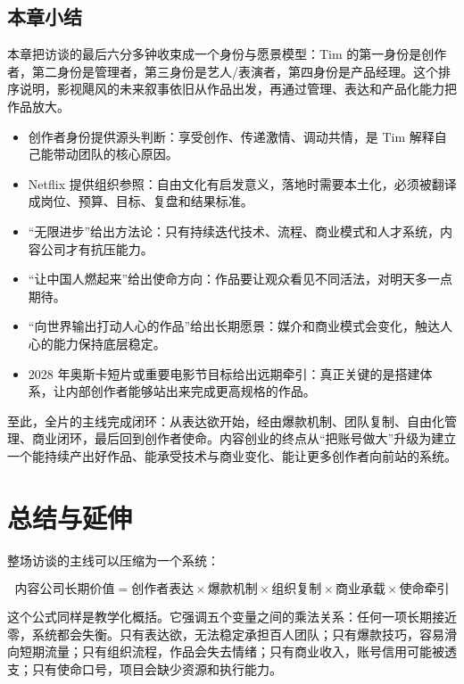 \documentclass[a4paper]{article}
\begin{document}
\subsection{本章小结}

本章把访谈的最后六分多钟收束成一个身份与愿景模型：Tim 的第一身份是创作者，第二身份是管理者，第三身份是艺人/表演者，第四身份是产品经理。这个排序说明，影视飓风的未来叙事依旧从作品出发，再通过管理、表达和产品化能力把作品放大。

\begin{itemize}
  \item 创作者身份提供源头判断：享受创作、传递激情、调动共情，是 Tim 解释自己能带动团队的核心原因。
  \item Netflix 提供组织参照：自由文化有启发意义，落地时需要本土化，必须被翻译成岗位、预算、目标、复盘和结果标准。
  \item “无限进步”给出方法论：只有持续迭代技术、流程、商业模式和人才系统，内容公司才有抗压能力。
  \item “让中国人燃起来”给出使命方向：作品要让观众看见不同活法，对明天多一点期待。
  \item “向世界输出打动人心的作品”给出长期愿景：媒介和商业模式会变化，触达人心的能力保持底层稳定。
  \item 2028 年奥斯卡短片或重要电影节目标给出远期牵引：真正关键的是搭建体系，让内部创作者能够站出来完成更高规格的作品。
\end{itemize}

至此，全片的主线完成闭环：从表达欲开始，经由爆款机制、团队复制、自由化管理、商业闭环，最后回到创作者使命。内容创业的终点从“把账号做大”升级为建立一个能持续产出好作品、能承受技术与商业变化、能让更多创作者向前站的系统。

\section{总结与延伸}

整场访谈的主线可以压缩为一个系统：

$$
\text{内容公司长期价值}
= \text{创作者表达} \times \text{爆款机制} \times \text{组织复制} \times \text{商业承载} \times \text{使命牵引}
$$

这个公式同样是教学化概括。它强调五个变量之间的乘法关系：任何一项长期接近零，系统都会失衡。只有表达欲，无法稳定承担百人团队；只有爆款技巧，容易滑向短期流量；只有组织流程，作品会失去情绪；只有商业收入，账号信用可能被透支；只有使命口号，项目会缺少资源和执行能力。
\end{document}
